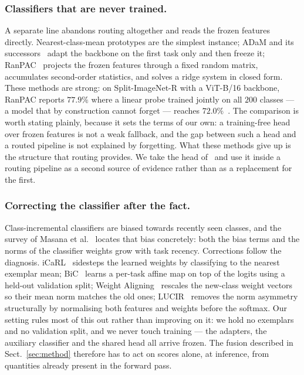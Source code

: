\documentclass[runningheads]{llncs}
\begin{document}
\subsubsection{Classifiers that are never trained.}
A separate line abandons routing altogether and reads the frozen features
directly. Nearest-class-mean prototypes are the simplest instance; ADaM and its
successors~\cite{ref_adam} adapt the backbone on the first task only and then
freeze it; RanPAC~\cite{ref_ranpac} projects the frozen features through a fixed
random matrix, accumulates second-order statistics, and solves a ridge system in
closed form. These methods are strong: on Split-ImageNet-R with a ViT-B/16
backbone, RanPAC reports $77.9\%$ where a linear probe trained jointly on all
$200$ classes --- a model that by construction cannot forget --- reaches
$72.0\%$~\cite{ref_ranpac}. The comparison is worth stating plainly, because it
sets the terms of our own: a training-free head over frozen features is not a
weak fallback, and the gap between such a head and a routed pipeline is not
explained by forgetting. What these methods give up is the structure that
routing provides. We take the head of~\cite{ref_ranpac} and use it inside a
routing pipeline as a second source of evidence rather than as a replacement for
the first.

\subsubsection{Correcting the classifier after the fact.}
Class-incremental classifiers are biased towards recently seen classes, and the
survey of Masana et al.~\cite{ref_survey} locates that bias concretely: both the
bias terms and the norms of the classifier weights grow with task recency.
Corrections follow the diagnosis. iCaRL~\cite{ref_icarl} sidesteps the learned
weights by classifying to the nearest exemplar mean; BiC~\cite{ref_bic} learns a
per-task affine map on top of the logits using a held-out validation split;
Weight Aligning~\cite{ref_wa} rescales the new-class weight vectors so their mean
norm matches the old ones; LUCIR~\cite{ref_lucir} removes the norm asymmetry
structurally by normalising both features and weights before the softmax. Our
setting rules most of this out rather than improving on it: we hold no exemplars
and no validation split, and we never touch training --- the adapters, the
auxiliary classifier and the shared head all arrive frozen. The fusion described
in Sect.~\ref{sec:method} therefore has to act on scores alone, at inference,
from quantities already present in the forward pass.
\end{document}
